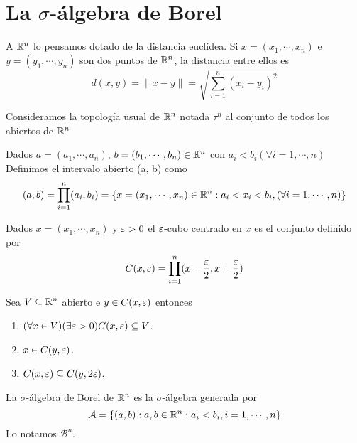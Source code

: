 \section{La $\sigma$-álgebra de Borel}
\label{sec:borel}

A $\mathbb{R}^n$ lo pensamos dotado de la distancia euclídea.
Si $x = (x_1, \cdots, x_n)$ e $y = (y_1, \cdots, y_n)$ son dos puntos de $\mathbb{R}^n$, la distancia 
entre ellos es
\begin{equation}
    d(x, y) = \|x-y\| = \sqrt{ \sum_{i=1}^n (x_i - y_i)^2 }
\end{equation}

Consideramos la topología usual de $\mathbb{R}^n$ notada $\tau^n$ al conjunto de todos los abiertos de $\mathbb{R}^n$

\begin{definition}
    Dados $a = (a_1, \cdots, a_n)$, $b = (b_1, \cdots, b_n) \in \mathbb{R}^n$ con $a_i < b_i (\forall i = 1, \cdots, n)$
    Definimos el intervalo abierto (a, b) como 
    \begin{equation}
        (a, b) = \prod_{i=1}^n (a_i, b_i) = \{ x = (x_1, \cdots, x_n) \in \mathbb{R}^n : a_i < x_i < b_i, (\forall i = 1, \cdots, n) \}
    \end{equation}
\end{definition}

\begin{definition}
    Dados $x= (x_1, \cdots, x_n)$ y $\varepsilon > 0$ el $\varepsilon$-cubo centrado en $x$ es el conjunto definido por
    \begin{equation}
        C(x, \varepsilon) = \prod_{i = 1}^n (x - \frac{\varepsilon}{2}, x + \frac{\varepsilon}{2})
    \end{equation}
\end{definition}

\begin{prop}
    Sea $V \subseteq \mathbb{R}^n$ abierto e $y \in C(x, \varepsilon)$ entonces
    \begin{enumerate}
        \item $(\forall x \in V)(\exists \varepsilon > 0) C(x, \varepsilon) \subseteq V$.
        \item $x \in C(y, \varepsilon)$.
        \item $C(x, \varepsilon) \subseteq C(y, 2\varepsilon)$.
    \end{enumerate}
\end{prop}

\clearpage

\begin{definition}
    La $\sigma$-álgebra de Borel de $\mathbb{R}^n$ es la $\sigma$-álgebra generada por
    \begin{equation}
        \mathcal{A} = \{ (a, b) : a, b \in \mathbb{R}^n : a_i < b_i, i = 1, \cdots, n \} 
    \end{equation}
    Lo notamos $\mathcal{B}^n$.
\end{definition}

